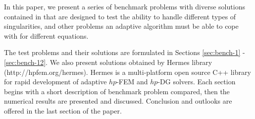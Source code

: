 In this paper, we present a series of benchmark problems 
with diverse solutions contained in \cite{mitchell-1}
that are designed to test the ability to handle different 
types of singularities, and other problems an adaptive algorithm must be able to cope with for different equations.

The test problems and their solutions are formulated in Sections
\ref{sec:bench-1} - \ref{sec:bench-12}. We also present solutions obtained by {\sc Hermes} library (http://hpfem.org/hermes). {\sc Hermes} is a multi-platform 
open source C++ library for rapid development of adaptive $hp$-FEM 
and $hp$-DG solvers. Each section begins with a short description
of benchmark problem compared, then the numerical results are
presented and discussed. Conclusion and outlooks are offered
in the last section of the paper.


